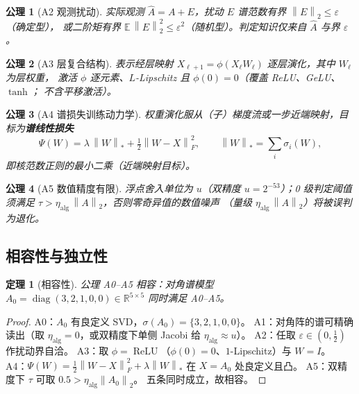 \documentclass[UTF8,11pt,a4paper]{ctexart}
\theoremstyle{plain}
\newtheorem{axiom}{公理}
\newtheorem{theorem}{定理}
\theoremstyle{definition}
\theoremstyle{remark}
\newcommand{\R}{\mathbb{R}}
\newcommand{\Ex}{\mathbb{E}}
\newcommand{\diag}{\operatorname{diag}}
\newcommand{\ReLU}{\operatorname{ReLU}}
\newcommand{\Fnorm}[1]{\left\lVert #1\right\rVert_F}
\newcommand{\Tnorm}[1]{\left\lVert #1\right\rVert_2}
\newcommand{\Nnorm}[1]{\left\lVert #1\right\rVert_{*}}
\newcommand{\half}{\tfrac12}
\begin{document}
\begin{axiom}[A2 观测扰动]\label{ax:A2}
实际观测 $\hat A=A+E$，扰动 $E$ 谱范数有界 $\Tnorm{E}\le\varepsilon$（确定型），
或二阶矩有界 $\Ex\,\Tnorm{E}^2\le\varepsilon^2$（随机型）。判定知识仅来自
$\hat A$ 与界 $\varepsilon$。
\end{axiom}

\begin{axiom}[A3 层复合结构]\label{ax:A3}
表示经层映射 $X_{\ell+1}=\phi(X_\ell W_\ell)$ 逐层演化，其中 $W_\ell$ 为层权重，
激活 $\phi$ 逐元素、$L$-Lipschitz 且 $\phi(0)=0$（覆盖 ReLU、GeLU、$\tanh$；
不含平移激活）。
\end{axiom}

\begin{axiom}[A4 谱损失训练动力学]\label{ax:A4}
权重演化服从（子）梯度流或一步近端映射，目标为\textbf{谱线性损失}
\[
\Psi(W)=\lambda\,\Nnorm{W}+\half\Fnorm{W-X}^2,
\qquad \Nnorm{W}=\sum_i\sigma_i(W),
\]
即核范数正则的最小二乘（近端映射目标）。
\end{axiom}

\begin{axiom}[A5 数值精度有限]\label{ax:A5}
浮点舍入单位为 $u$（双精度 $u=2^{-53}$）；0 级判定阈值须满足
$\tau>\eta_{\mathrm{alg}}\,\Tnorm{A}$，否则零奇异值的数值噪声
（量级 $\eta_{\mathrm{alg}}\,\Tnorm{A}$）将被误判为退化。
\end{axiom}

\subsection{相容性与独立性}

\begin{theorem}[相容性]\label{thm:consistency}
公理 A0--A5 相容：对角谱模型 $A_0=\diag(3,2,1,0,0)\in\R^{5\times5}$ 同时满足 A0--A5。
\end{theorem}
\begin{proof}
A0：$A_0$ 有良定义 SVD，$\sigma(A_0)=\{3,2,1,0,0\}$。
A1：对角阵的谱可精确读出（取 $\eta_{\mathrm{alg}}=0$，或双精度下单侧 Jacobi 给
$\eta_{\mathrm{alg}}\approx u$）。
A2：任取 $\varepsilon\in(0,\half)$ 作扰动界自洽。
A3：取 $\phi=\ReLU$（$\phi(0)=0$、$1$-Lipschitz）与 $W=I$。
A4：$\Psi(W)=\half\Fnorm{W-X}^2+\lambda\Nnorm{W}$ 在 $X=A_0$ 处良定义且凸。
A5：双精度下 $\tau$ 可取 $0.5>\eta_{\mathrm{alg}}\Tnorm{A_0}$。
五条同时成立，故相容。
\end{proof}
\end{document}
